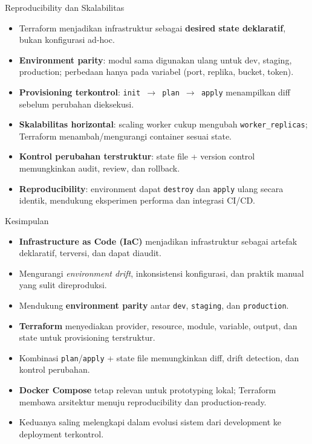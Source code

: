 \documentclass[aspectratio=169, table]{beamer}
\begin{document}
\begin{frame}{Reproducibility dan Skalabilitas}
\vspace{10pt}
\begin{itemize}\small
    \item Terraform menjadikan infrastruktur sebagai \textbf{desired state deklaratif}, bukan konfigurasi ad-hoc.
    
    \item \textbf{Environment parity}: modul sama digunakan ulang untuk dev, staging, production; 
          perbedaan hanya pada variabel (port, replika, bucket, token).

    \item \textbf{Provisioning terkontrol}: 
          \texttt{init $\rightarrow$ plan $\rightarrow$ apply} menampilkan diff sebelum perubahan dieksekusi.

    \item \textbf{Skalabilitas horizontal}: 
          scaling worker cukup mengubah \texttt{worker\_replicas}; 
          Terraform menambah/mengurangi container sesuai state.

    \item \textbf{Kontrol perubahan terstruktur}: 
          state file + version control memungkinkan audit, review, dan rollback.

    \item \textbf{Reproducibility}: 
          environment dapat \texttt{destroy} dan \texttt{apply} ulang secara identik,
          mendukung eksperimen performa dan integrasi CI/CD.
\end{itemize}
\end{frame}


\begin{frame}{Kesimpulan}
	\vspace{10pt}
	\begin{itemize}\small
		\item \textbf{Infrastructure as Code (IaC)} menjadikan infrastruktur sebagai artefak deklaratif, terversi, dan dapat diaudit.
		\item Mengurangi \textit{environment drift}, inkonsistensi konfigurasi, dan praktik manual yang sulit direproduksi.
		\item Mendukung \textbf{environment parity} antar \texttt{dev}, \texttt{staging}, dan \texttt{production}.
		\item \textbf{Terraform} menyediakan provider, resource, module, variable, output, dan state untuk provisioning terstruktur.
		\item Kombinasi \texttt{plan}/\texttt{apply} + state file memungkinkan diff, drift detection, dan kontrol perubahan.
		\item \textbf{Docker Compose} tetap relevan untuk prototyping lokal; Terraform membawa arsitektur menuju reproducibility dan production-ready.
		\item Keduanya saling melengkapi dalam evolusi sistem dari development ke deployment terkontrol.
	\end{itemize}
\end{frame}
\end{document}

